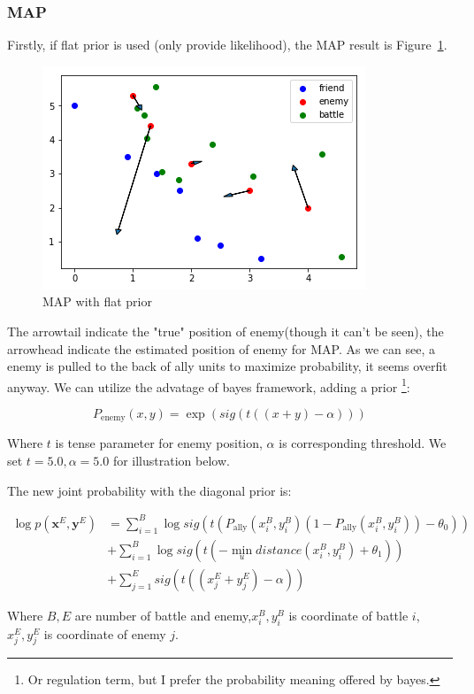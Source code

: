 \documentclass{article}
\begin{document}
\subsubsection{MAP}

Firstly, if flat prior is used (only provide likelihood), the MAP result is Figure~\ref{fig:MAPone}.

\begin{figure}[h!]
\includegraphics[width=0.6\linewidth]{MAP1.png}
\caption{MAP with flat prior}
\label{fig:MAPone}
\end{figure}

The arrowtail indicate the "true" position of enemy(though it can't be seen), 
the arrowhead indicate the estimated position of enemy for MAP. As we can see,
a enemy is pulled to the back of ally units to maximize probability, it seems overfit anyway.
We can utilize the advatage of bayes framework, adding a prior \footnote{Or regulation term, but I
prefer the probability meaning offered by bayes.}:


$$
P_{\text{enemy}}(x,y) = \exp(sig(t((x+y) - \alpha)))
$$

Where $t$ is tense parameter for enemy position,
$\alpha$ is corresponding threshold. We set $t=5.0,\alpha=5.0$
for illustration below.

The new joint probability with the diagonal prior is:

\begin{align*}
\log p(\mathbf{x}^E,\mathbf{y}^E) &= \sum_{i=1}^B \log sig(t (P_\text{ally}(x^B_i,y^B_i)(1-P_\text{ally}(x^B_i,y^B_i)) - \theta_0)) \\
                                  &+ \sum_{i=1}^B \log sig(t(-\min_{u} distance(x^B_i,y^B_i) + \theta_1)) \\
                                  &+ \sum_{j=1}^E sig(t((x^E_j+y^E_j) - \alpha))
\end{align*}

Where $B,E$ are number of battle and enemy,$x^B_i,y^B_i$ is coordinate of battle $i$, $x^E_j,y^E_j$
is coordinate of enemy $j$.
\end{document}
